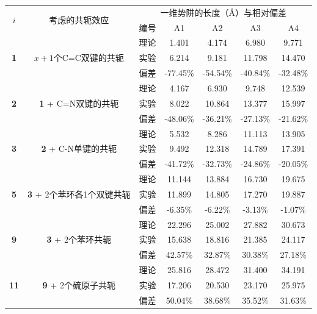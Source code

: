 \newpage
\begin{table}[htbp]
    \centering
    \begin{tabular}{cc|ccccc}
        \toprule
        \multirow{2}{*}{$i$} & \multirow{2}{*}{考虑的共轭效应} & \multicolumn{5}{c}{一维势阱的长度（\si{\r{A}}）与相对偏差}\\
        & & 编号 & A1 & A2 & A3 & A4 \\
        \midrule
        \multirow{3}{*}{\textbf{1}} & \multirow{3}{*}{$x+1$个C=C双键的共轭} & 理论 & 1.401 & 4.174 & 6.980 & 9.771 \\
        & & 实验 & 6.214 & 9.181 & 11.798 & 14.470 \\
        & & 偏差 & -77.45\% & -54.54\% & -40.84\% & -32.48\%\\
        \midrule
        \multirow{3}{*}{\textbf{2}} & \multirow{3}{*}{\textbf{1} + C=N双键的共轭} & 理论 & 4.167 & 6.930 & 9.748 & 12.539 \\
        & & 实验 & 8.022 & 10.864 & 13.377 & 15.997 \\
        & & 偏差 & -48.06\% & -36.21\% & -27.13\% & -21.62\%\\
        \midrule
        \multirow{3}{*}{\textbf{3}} & \multirow{3}{*}{\textbf{2} + C-N单键的共轭} & 理论 & 5.532 & 8.286 & 11.113 & 13.905 \\
        & & 实验 & 9.492 & 12.318 & 14.789 & 17.391 \\
        & & 偏差 & -41.72\% & -32.73\% & -24.86\% & -20.05\%\\
        \midrule
        \multirow{3}{*}{\textbf{5}} & \multirow{3}{*}{\textbf{3} + 2个苯环各1个双键共轭} & 理论 & 11.144 & 13.884 & 16.730 & 19.675 \\
        & & 实验 & 11.899 & 14.805 & 17.270 & 19.887 \\
        & & 偏差 & -6.35\% & -6.22\% & -3.13\% & -1.07\%\\
        \midrule
        \multirow{3}{*}{\textbf{9}} & \multirow{3}{*}{\textbf{3} + 2个苯环共轭} & 理论 & 22.296 & 25.002 & 27.882 & 30.673 \\
        & & 实验 & 15.638 & 18.816 & 21.385 & 24.117 \\
        & & 偏差 & 42.57\% & 32.87\% & 30.38\% & 27.18\%\\
        \midrule
        \multirow{3}{*}{\textbf{11}} & \multirow{3}{*}{\textbf{9} + 2个硫原子共轭} & 理论 & 25.816 & 28.472 & 31.400 & 34.191 \\
        & & 实验 & 17.206 & 20.530 & 23.170 & 25.975 \\
        & & 偏差 & 50.04\% & 38.68\% & 35.52\% & 31.63\%\\
        \bottomrule
    \end{tabular}
    \label{tab:10}
\end{table}

